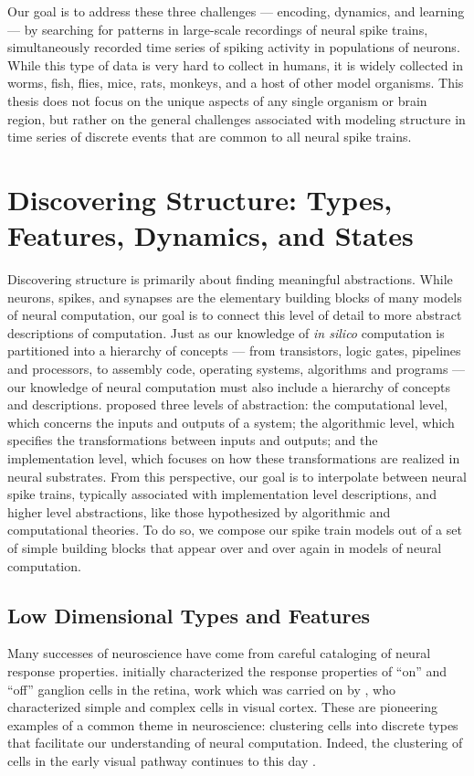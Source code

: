Our goal is to address these three challenges --- encoding,
dynamics, and learning --- by searching for patterns in large-scale
recordings of neural spike trains, simultaneously recorded time series
of spiking activity in populations of neurons. While this type of data is
very hard to collect in humans, it is widely collected in worms, fish,
flies, mice, rats, monkeys, and a host of other model organisms.
This thesis does not focus on the unique aspects of any single organism
or brain region, but rather on the general challenges associated
with modeling structure in time series of discrete events that are
common to all neural spike trains. 


\section{Discovering Structure: Types, Features, Dynamics, and States}
Discovering structure is primarily about finding meaningful abstractions.  
While neurons, spikes, and
synapses are the elementary building blocks of many models of neural
computation, our goal is to connect this level of detail to more
abstract descriptions of computation.  Just as our knowledge of
\emph{in silico} computation is partitioned into a hierarchy of
concepts --- from transistors, logic gates, pipelines and processors,
to assembly code, operating systems, algorithms and programs --- our
knowledge of neural computation must also include a hierarchy of
concepts and descriptions.  \citet{marr1982vision} proposed three
levels of abstraction: the computational level, which concerns the inputs
and outputs of a system; the algorithmic level, which specifies the
transformations between inputs and outputs; and the implementation
level, which focuses on how these transformations are realized in
neural substrates.  From this perspective, our goal is to interpolate
between neural spike trains, typically associated with implementation
level descriptions, and higher level abstractions, like those
hypothesized by algorithmic and computational theories. To do so,
we compose our spike train models out of a set of simple
building blocks that appear over and over again in models of
neural computation. 

\subsection{Low Dimensional Types and Features}
Many successes of neuroscience have come from careful cataloging 
of neural response properties. \citet{kuffler1953discharge} initially characterized 
the response properties of ``on'' and ``off'' ganglion cells in the 
retina, work which was carried on by \citet{hubel1962receptive}, 
who characterized simple and complex cells in visual cortex. 
These are pioneering examples of a common theme in neuroscience: 
clustering cells into discrete types that facilitate our understanding 
of neural computation. Indeed, the clustering of cells in the 
early visual pathway continues to this day \citep{macosko2015highly, sanes2015types}. 

